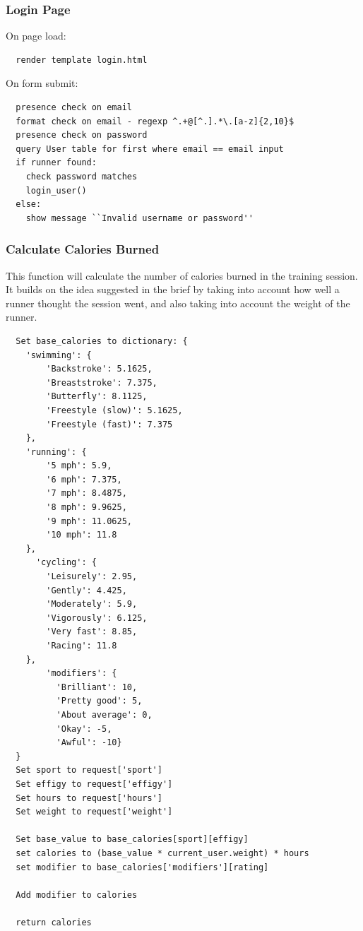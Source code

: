 \documentclass{article}[12pt,a4paper]
\begin{document}
\subsubsection{Login Page}
On page load:
\begin{verbatim}
  render template login.html
\end{verbatim}

\noindent
On form submit:
\begin{verbatim}
  presence check on email
  format check on email - regexp ^.+@[^.].*\.[a-z]{2,10}$
  presence check on password
  query User table for first where email == email input
  if runner found:
    check password matches
    login_user()
  else:
    show message ``Invalid username or password''
\end{verbatim}

\subsubsection{Calculate Calories Burned}
This function will calculate the number of calories burned in the training session. It builds on the idea suggested in the brief by taking into account how well a runner thought the session went, and also taking into account the weight of the runner.

\begin{verbatim}
  Set base_calories to dictionary: {
    'swimming': {
        'Backstroke': 5.1625, 
        'Breaststroke': 7.375, 
        'Butterfly': 8.1125, 
        'Freestyle (slow)': 5.1625,
        'Freestyle (fast)': 7.375
    },
    'running': {
        '5 mph': 5.9, 
        '6 mph': 7.375, 
        '7 mph': 8.4875, 
        '8 mph': 9.9625, 
        '9 mph': 11.0625, 
        '10 mph': 11.8
    },
      'cycling': {
        'Leisurely': 2.95, 
        'Gently': 4.425, 
        'Moderately': 5.9, 
        'Vigorously': 6.125, 
        'Very fast': 8.85,
        'Racing': 11.8
    },
        'modifiers': {
          'Brilliant': 10, 
          'Pretty good': 5, 
          'About average': 0, 
          'Okay': -5, 
          'Awful': -10}
  }
  Set sport to request['sport']
  Set effigy to request['effigy']
  Set hours to request['hours']
  Set weight to request['weight']

  Set base_value to base_calories[sport][effigy]
  set calories to (base_value * current_user.weight) * hours
  set modifier to base_calories['modifiers'][rating]

  Add modifier to calories

  return calories
\end{verbatim}
\end{document}
